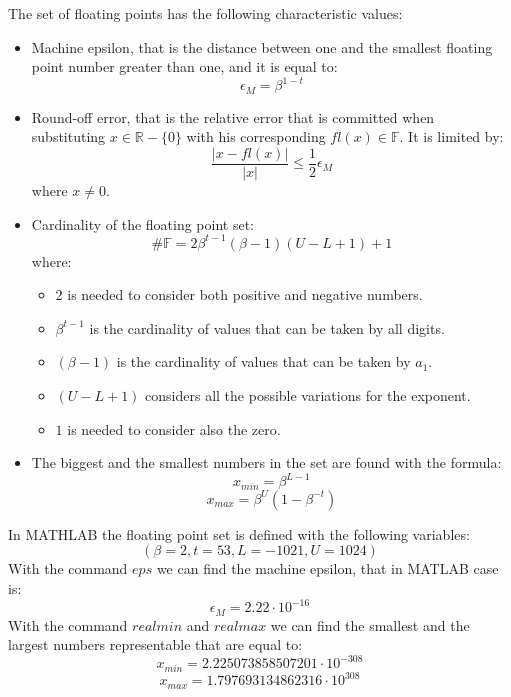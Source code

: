 \documentclass[12pt, a4paper]{report}
\theoremstyle{remark}
\begin{document}
The set of floating points has the following characteristic values:
\begin{itemize}
    \item Machine epsilon, that is the distance between one and the smallest floating point number greater than one, and it is equal to: 
        \[\epsilon_M=\beta^{1-t}\]
    \item Round-off error, that is the relative error that is committed when substituting $x \in \mathbb{R}-\{0\}$ with his corresponding 
        $fl(x) \in \mathbb{F}$. It is limited by: 
        \[\dfrac{\left\lvert x-fl(x) \right\rvert}{\left\lvert x \right\rvert }\leq \dfrac{1}{2}\epsilon_M\]
        where $x \neq 0$.
    \item Cardinality of the floating point set:
        \[\#\mathbb{F}=2 \beta^{t-1}(\beta -1)(U-L+1)+1\]
        where: 
        \begin{itemize}
            \item $2$ is needed to consider both positive and negative numbers. 
            \item $\beta^{t-1}$ is the cardinality of values that can be taken by all digits.
            \item $(\beta -1)$ is the cardinality of values that can be taken by $a_1$.
            \item $(U-L+1)$ considers all the possible variations for the exponent.
            \item $1$ is needed to consider also the zero. 
        \end{itemize}
    \item The biggest and the smallest numbers in the set are found with the formula:
        \[x_{min}=\beta^{L-1}\]
        \[x_{max}=\beta^U(1-\beta^{-t})\]
\end{itemize}
\begin{example}
    In MATHLAB the floating point set is defined with the following variables:
    \[(\beta=2,t=53,L=-1021,U=1024)\] 
    With the command $eps$ we can find the machine epsilon, that in MATLAB case is:
    \[\epsilon_M=2.22 \cdot 10^{-16}\]
    With the command $realmin$ and $realmax$ we can find the smallest and the largest numbers representable that are equal to:
    \[x_{min}=2.225073858507201 \cdot 10^{-308}\]
    \[x_{max}=1.797693134862316 \cdot 10^{308}\]
\end{example}
\end{document}
